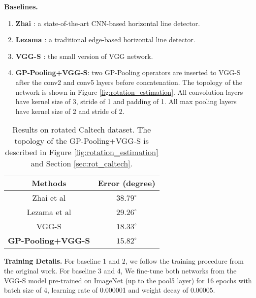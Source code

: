 \documentclass[10pt,twocolumn,letterpaper]{article}
\begin{document}
\vspace{1mm}\noindent\textbf{Baselines.}
\vspace{-0.2cm}
\begin{enumerate}
    \setlength\topsep{-1mm}
    \setlength\itemsep{-1.5mm}
    \item \textbf{Zhai \etal \cite{Zhai2016}}: a state-of-the-art CNN-based horizontal line detector.
    \item \textbf{Lezama \etal \cite{Lezama2014}}: a traditional edge-based horizontal line detector.
    \item \textbf{VGG-S \cite{Simonyan2014}}: the small version of VGG network.
    \item \textbf{GP-Pooling+VGG-S}: two GP-Pooling operators are inserted to VGG-S after the conv2 and conv5 layers before concatenation. The topology of the network is shown in Figure \ref{fig:rotation_estimation}. All convolution layers have kernel size of 3, stride of 1 and padding of 1. All max pooling layers have kernel size of 2 and stride of 2.
    \end{enumerate}
\vspace{-0.2cm}

\begin{table}[tb]
\centering
\footnotesize
\begin{tabular}{ |c|c| }
        \hline
        Methods & Error (degree) \\
        \hline
        \hline
        Zhai et al \cite{Zhai2016}          &       $38.79^{\circ}$       \\
        Lezama et al \cite{Lezama2014}      &       $29.26^{\circ}$       \\
        VGG-S \cite{Simonyan2014}           &       $18.33^{\circ}$       \\
        \textbf{GP-Pooling+VGG-S}                    &       $\mathbf{15.82^{\circ}}$       \\
        \hline
\end{tabular}
\vspace{0.2cm}
\caption{Results on rotated Caltech dataset. The topology of the GP-Pooling+VGG-S is described in Figure \ref{fig:rotation_estimation} and Section \ref{sec:rot_caltech}.}
\label{tab:res_caltech} 
\vspace{-0.3cm}
\end{table}

\noindent\textbf{Training Details.} For baseline 1 and 2, we follow the training procedure from the original work. For baseline 3 and 4, We fine-tune both networks from the VGG-S model pre-trained on ImageNet (up to the pool5 layer) for 16 epochs with batch size of 4, learning rate of 0.000001 and weight decay of 0.00005.
\end{document}
